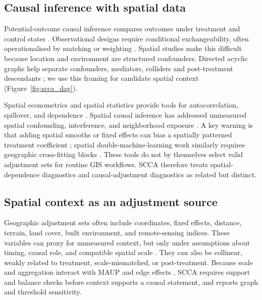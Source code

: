 \documentclass{article}
\begin{document}
\subsection{Causal inference with spatial data}

Potential-outcome causal inference compares outcomes under treatment and control states \citep{imbens2015causal,hernan2020whatif}. Observational designs require conditional exchangeability, often operationalised by matching or weighting \citep{rosenbaum1983central, stuart2010matching}. Spatial studies make this difficult because location and environment are structured confounders. Directed acyclic graphs help separate confounders, mediators, colliders and post-treatment descendants \citep{pearl2009causality,vanderweele2015explanation}; we use this framing for candidate spatial context (Figure~\ref{fig:scca_dag}).

Spatial econometrics and spatial statistics provide tools for autocorrelation, spillover, and dependence \citep{anselin1988spatial,lesage2009introduction,anselin2014modern}. Spatial causal inference has addressed unmeasured spatial confounding, interference, and neighborhood exposure \citep{reich2021review,gilbert2021spatialconfounding,giffin2023gpsinterference,papadogeorgou2022causal,schnell2020mitigating}. A key warning is that adding spatial smooths or fixed effects can bias a spatially patterned treatment coefficient \citep{hodges2010adding,paciorek2010importance,dupont2022spatial+,khan2022restricted}; spatial double-machine-learning work similarly requires geographic cross-fitting blocks \citep{tec2023spatialdml}. These tools do not by themselves select valid adjustment sets for routine GIS workflows. SCCA therefore treats spatial-dependence diagnostics and causal-adjustment diagnostics as related but distinct.

\subsection{Spatial context as an adjustment source}

Geographic adjustment sets often include coordinates, fixed effects, distance, terrain, land cover, built environment, and remote-sensing indices. These variables can proxy for unmeasured context, but only under assumptions about timing, causal role, and compatible spatial scale \citep{gilbert2021spatialconfounding,vanderweele2015explanation}. They can also be collinear, weakly related to treatment, scale-mismatched, or post-treatment. Because scale and aggregation interact with MAUP and edge effects \citep{openshaw1984maup,fotheringham1991modifiable,manley2006maup}, SCCA requires support and balance checks before context supports a causal statement, and reports graph and threshold sensitivity.
\end{document}
